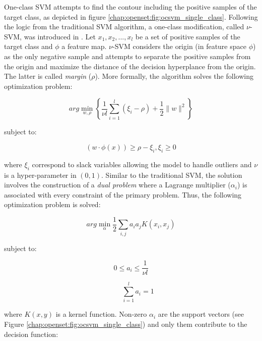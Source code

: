 One-class SVM attempts to find the contour including the positive samples of the target class, as depicted in figure \ref{chap:openset:fig:ocsvm_single_class}. Following the logic from the traditional SVM algorithm, a one-class modification, called $\nu$-SVM, was introduced in \parencite{scholkopf1999estimating}. Let $x_1, x_2,..., x_l$ be a set of positive samples of the target class and $\phi$ a feature map. $\nu$-SVM considers the origin (in feature space $\phi$) as the only negative sample and attempts to separate the positive samples from the origin and maximize the distance of the decision hyperplance from the origin. The latter is called \textit{margin} ($\rho$). More formally, the algorithm solves the following optimization problem:

\begin{equation}\label{chap:openset:sec:eq:3}
	arg\min_{w,\rho}\left\{ \frac{1}{\nu l} \sum_{i=1}^{l}(\xi_{i}-\rho)+\frac{1}{2}\|w\|^{2}\right\}
\end{equation}

\nointend subject to:

\begin{equation}
    (w \cdot \phi(x)) \geq \rho - \xi_i, \xi_i \geq 0
\end{equation}

\noindent where $\xi_i$ correspond to slack variables allowing the model to handle outliers and $\nu$ is a hyper-parameter in $(0,1)$. Similar to the traditional SVM, the solution involves the construction of a \textit{dual problem} where a Lagrange multiplier ($\alpha_i$) is associated with every constraint of the primary problem. Thus, the following optimization problem is solved:

\begin{equation}\label{chap:openset:sec:eq:12}
	arg\min_{\alpha}\frac{1}{2}\sum_{i,j}a_{i}a_{j}K(x_{i},x_{j})
\end{equation}

\nointent subject to:

\begin{equation}\label{chap:openset:sec:eq:4}
	0\leqslant a_{i}\leqslant \frac{1}{\nu l} %
\end{equation}

\begin{equation}\label{chap:openset:sec:eq:5}
	\qquad \sum_{i=1}^{l}a_{i}=1
\end{equation}

\nointend where $K(x,y)$ is a kernel function. Non-zero $\alpha_i$ are the support vectors (see Figure \ref{chap:openset:fig:ocsvm_single_class}) and only them contribute to the decision function:

